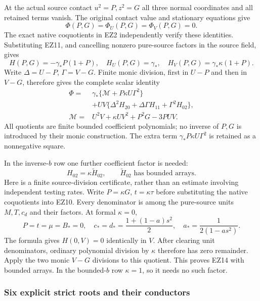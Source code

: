 At the actual source contact $u^2=P,z^2=G$ all three normal
coordinates and all retained terms vanish. The original contact
value and stationary equations give
\[
 \Phi(P,G)=\Phi_U(P,G)=\Phi_V(P,G)=0.                            \tag{EZ12}
\]
The exact native coquotients in EZ2 independently verify these
identities. Substituting EZ11, and cancelling nonzero pure-source
factors in the source field, gives
\[
 H(P,G)=-\gamma_*P(1+P),\quad
 H_U(P,G)=\gamma_*,\quad
 H_V(P,G)=\gamma_*\kappa(1+P).
\]
Write $\Delta=U-P$, $\Gamma=V-G$.
Finite monic division, first in $U-P$ and then in $V-G$,
therefore gives the complete scalar identity
\[
\begin{split}
 \Phi={}&\gamma_*\{\mathcal M+P\kappa U\Gamma^2\}\\
 &+UV\{\Delta^2H_{20}+\Delta\Gamma H_{11}
                                      +\Gamma^2H_{02}\},\\
 \mathcal M={}&U^2V+\kappa UV^2+P^2G-3PUV .
\end{split}                                                     \tag{EZ13}
\]
All quotients are finite bounded coefficient polynomials; no
inverse of $P,G$ is introduced by their monic construction.
The extra term $\gamma_*P\kappa U\Gamma^2$ is retained as a
nonnegative square.

In the inverse-$b$ row one further coefficient factor is needed:
\[
                         H_{02}=\kappa\widetilde H_{02},
 \qquad\widetilde H_{02}\text{ has bounded arrays}.              \tag{EZ14}
\]
Here is a finite source-division certificate, rather than an
estimate involving independent testing rates. Write
$P=\kappa G$, $t=\kappa\tau$ before substituting the native
coquotients into EZ10. Every denominator is among the pure-source
units $M,T,c_d$ and their factors. At formal $\kappa=0$,
\[
 P=t=\mu=B_*=0,\quad
 c_*=d_*=\frac{1+(1-a)s^2}{2},\quad
 a_*=\frac1{2(1-as^2)} .
\]
The formula gives $H(0,V)=0$ identically in $V$.
After clearing unit denominators, ordinary polynomial division
by $\kappa$ therefore has zero remainder. Apply the two monic
$V-G$ divisions to this quotient. This proves EZ14 with bounded
arrays. In the bounded-$b$ row $\kappa=1$, so it needs no such
factor.

\subsubsection*{Six explicit strict roots and their conductors}

